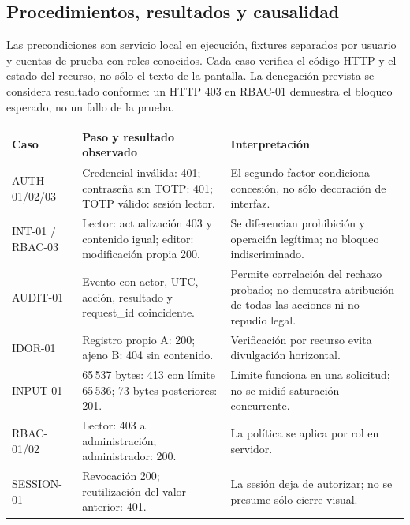 \documentclass[10pt,a4paper]{article}
\newcommand{\cabecera}[1]{\textbf{#1}}
\begin{document}
\subsection*{Procedimientos, resultados y causalidad}
Las precondiciones son servicio local en ejecución, fixtures separados por usuario y cuentas de prueba con roles conocidos. Cada caso verifica el código HTTP y el estado del recurso, no sólo el texto de la pantalla. La denegación prevista se considera resultado conforme: un HTTP 403 en RBAC-01 demuestra el bloqueo esperado, no un fallo de la prueba.
\begin{TablaCompacta}
\begin{longtable}{P{29mm}P{67mm}P{63mm}}
\toprule\cabecera{Caso} & \cabecera{Paso y resultado observado} & \cabecera{Interpretación}\\\midrule\endhead
AUTH-01/02/03 & Credencial inválida: 401; contraseña sin TOTP: 401; TOTP válido: sesión lector. & El segundo factor condiciona concesión, no sólo decoración de interfaz.\\
INT-01 / RBAC-03 & Lector: actualización 403 y contenido igual; editor: modificación propia 200. & Se diferencian prohibición y operación legítima; no bloqueo indiscriminado.\\
AUDIT-01 & Evento con actor, UTC, acción, resultado y request\_id coincidente. & Permite correlación del rechazo probado; no demuestra atribución de todas las acciones ni no repudio legal.\\
IDOR-01 & Registro propio A: 200; ajeno B: 404 sin contenido. & Verificación por recurso evita divulgación horizontal.\\
INPUT-01 & 65\,537 bytes: 413 con límite 65\,536; 73 bytes posteriores: 201. & Límite funciona en una solicitud; no se midió saturación concurrente.\\
RBAC-01/02 & Lector: 403 a administración; administrador: 200. & La política se aplica por rol en servidor.\\
SESSION-01 & Revocación 200; reutilización del valor anterior: 401. & La sesión deja de autorizar; no se presume sólo cierre visual.\\\bottomrule
\end{longtable}
\end{TablaCompacta}
\end{document}
